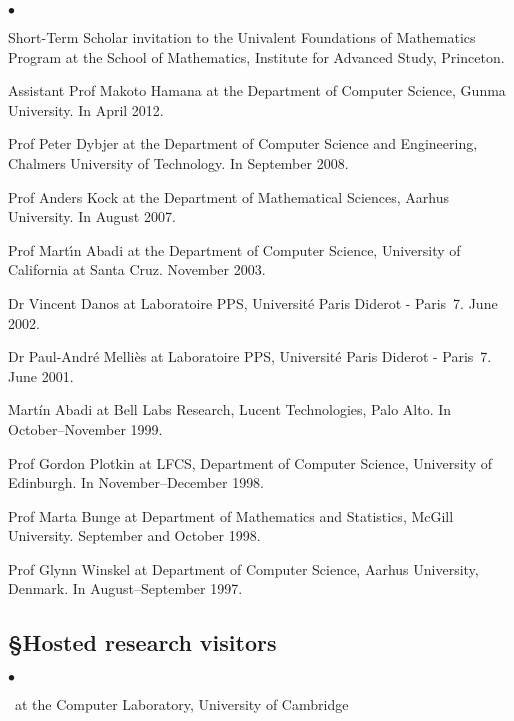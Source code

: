 \documentclass[11pt,twocolumn]{article}
\newenvironment{myitemize}
  {\begin{list}{$\bullet$}
  {\setlength{\topsep}{1pt}
   \setlength{\partopsep}{1pt}
   \setlength{\itemsep}{0pt}
   \setlength{\parsep}{0pt}
   \setlength{\leftmargin}{1em}
   \setlength{\labelwidth}{.5em}}}
  {\end{list}}
\begin{document}
\begin{myitemize}
\item
  Short-Term Scholar invitation to the Univalent Foundations of Mathematics
  Program at the School of Mathematics, Institute for Advanced Study,
  Princeton. 

\item
  Assistant Prof Makoto Hamana at the Department of Computer Science,
  Gunma University.  In April 2012.

\item
  Prof Peter Dybjer at the Department of Computer Science and Engineering,
  Chalmers University of Technology.  In September 2008. 

\item
  Prof Anders Kock at the Department of Mathematical Sciences, Aarhus
  University.  In August 2007. 

\item
  Prof Mart\'{\i}n Abadi at the Department of Computer Science, University
  of California at Santa Cruz.  November 2003. 

\item
  Dr Vincent Danos at Laboratoire PPS, Universit\'e Paris Diderot -
  Paris~7.  June 2002.

\item
  Dr Paul-Andr\'e Melli\`es at Laboratoire PPS, Universit\'e Paris Diderot
  - Paris~7.  June 2001.

\item
  Mart\'{i}n Abadi at Bell Labs Research, Lucent Technologies, Palo Alto.
  In October--November 1999. 

\item
  Prof Gordon Plotkin at LFCS, Department of Computer Science, University
  of Edinburgh.  In November--December 1998.

\item
  Prof Marta Bunge at Department of Mathematics and Statistics, McGill
  University.  September and October 1998.

\item
  Prof Glynn Winskel at Department of Computer Science, Aarhus University,
  Denmark.  In August--September 1997.
\end{myitemize}

\vspace*{-1mm}
\subsection*{\S\enspace\thinspace Hosted research visitors}
\vspace*{-2mm}
\begin{myitemize}
\item[]\small\ at the Computer Laboratory, University of Cambridge
\end{myitemize}
\pagebreak
\end{document}
